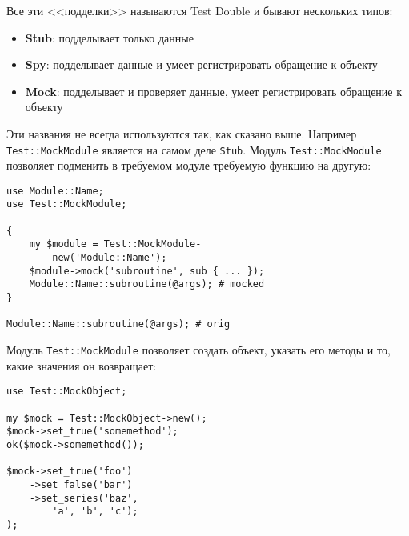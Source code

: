 Все эти <<подделки>> называются Test Double и бывают нескольких типов:
\begin{itemize}[nosep]
	\item \textbf{Stub}: подделывает только данные
	\item \textbf{Spy}: подделывает данные и умеет регистрировать обращение к объекту
	\item \textbf{Mock}: подделывает и проверяет данные, умеет регистрировать обращение к объекту
\end{itemize}

Эти названия не всегда используются так, как сказано выше. Например \verb|Test::MockModule| является на самом деле \verb|Stub|. Модуль \verb|Test::MockModule| позволяет подменить в требуемом модуле требуемую функцию на другую:
\begin{verbatim}
use Module::Name;
use Test::MockModule;

{
    my $module = Test::MockModule-
        new('Module::Name');
    $module->mock('subroutine', sub { ... });
    Module::Name::subroutine(@args); # mocked
}

Module::Name::subroutine(@args); # orig
\end{verbatim}
Модуль \verb|Test::MockModule| позволяет создать объект, указать его методы и то, какие значения он возвращает:
\begin{verbatim}
use Test::MockObject;

my $mock = Test::MockObject->new();
$mock->set_true('somemethod');
ok($mock->somemethod());

$mock->set_true('foo')
    ->set_false('bar')
    ->set_series('baz',
        'a', 'b', 'c');
);
\end{verbatim}
